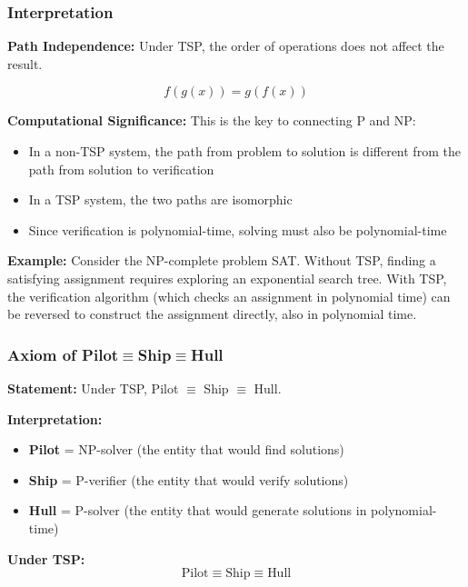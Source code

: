 \documentclass[11pt, letterpaper]{article}
\begin{document}
\subsubsection{Interpretation}

\textbf{Path Independence:} Under TSP, the order of operations does not affect the result.

\begin{equation}
f(g(x)) = g(f(x))
\end{equation}

\textbf{Computational Significance:} This is the key to connecting P and NP:
\begin{itemize}
    \item In a non-TSP system, the path from problem to solution is different from the path from solution to verification
    \item In a TSP system, the two paths are isomorphic
    \item Since verification is polynomial-time, solving must also be polynomial-time
\end{itemize}

\textbf{Example:} Consider the NP-complete problem SAT. Without TSP, finding a satisfying assignment requires exploring an exponential search tree. With TSP, the verification algorithm (which checks an assignment in polynomial time) can be reversed to construct the assignment directly, also in polynomial time.

\subsubsection{\texorpdfstring{Axiom of Pilot$\equiv$Ship$\equiv$Hull}{Axiom of Pilot=Ship=Hull}}

\textbf{Statement:} Under TSP, Pilot $\equiv$ Ship $\equiv$ Hull.

\textbf{Interpretation:}
\begin{itemize}
    \item \textbf{Pilot} = NP-solver (the entity that would find solutions)
    \item \textbf{Ship} = P-verifier (the entity that would verify solutions)
    \item \textbf{Hull} = P-solver (the entity that would generate solutions in polynomial-time)
\end{itemize}

\textbf{Under TSP:}
\begin{equation}
\text{Pilot} \equiv \text{Ship} \equiv \text{Hull}
\end{equation}
\end{document}
